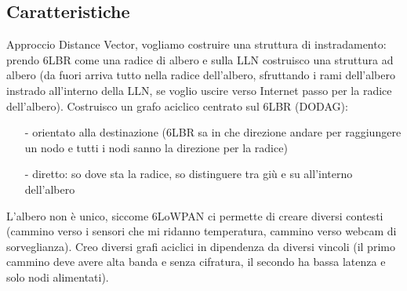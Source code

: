 \documentclass[12pt,italian]{report}
\begin{document}
\subsection{Caratteristiche}
Approccio Distance Vector, vogliamo costruire una struttura di instradamento: prendo 6LBR come una radice di albero e sulla LLN costruisco una struttura ad albero (da fuori arriva tutto nella radice dell'albero, sfruttando i rami dell'albero instrado all'interno della LLN, se voglio uscire verso Internet passo per la radice dell'albero). 
\bigbreak
Costruisco un grafo aciclico centrato sul 6LBR (DODAG):
\begin{itemize}
    \item [-] orientato alla destinazione (6LBR sa in che direzione andare per raggiungere un nodo e tutti i nodi sanno la direzione per la radice)
    \item [-] diretto: so dove sta la radice, so distinguere tra giù e su all'interno dell'albero
\end{itemize}
L'albero non è unico, siccome 6LoWPAN ci permette di creare diversi contesti (cammino verso i sensori che mi ridanno temperatura, cammino verso webcam di sorveglianza). Creo diversi grafi aciclici in dipendenza da diversi vincoli (il primo cammino deve avere alta banda e senza cifratura, il secondo ha bassa latenza e solo nodi alimentati). 
\end{document}
